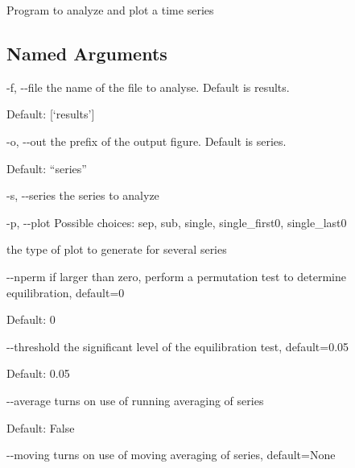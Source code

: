 \documentclass[letterpaper,10pt,english]{sphinxmanual}
\begin{document}
Program to analyze and plot a time series


%
\begin{sphinxVerbatim}[commandchars=\\\{\}]
  \PYG{p}{[}\PYG{p}{]} \PYG{p}{[}  \PYG{p}{[} \PYG{p}{]}\PYG{p}{]} \PYG{p}{[} \PYG{p}{]}
                      \PYG{p}{[}  \PYG{p}{[} \PYG{p}{]}\PYG{p}{]}
                      \PYG{p}{[} \PYG{p}{]}
                      \PYG{p}{[} \PYG{p}{]} \PYG{p}{[} \PYG{p}{]} \PYG{p}{[}\PYG{p}{]}
                      \PYG{p}{[} \PYG{p}{]}
\end{sphinxVerbatim}


\subsection{Named Arguments}
\label{\detokenize{tools:Named Arguments}}\begin{optionlist}{3cm}
\item [-f, -{-}file]  
the name of the file to analyse. Default is results.

Default: {[}‘results’{]}
\item [-o, -{-}out]  
the prefix of the output figure. Default is series.

Default: “series”
\item [-s, -{-}series]  
the series to analyze
\item [-p, -{-}plot]  
Possible choices: sep, sub, single, single\_first0, single\_last0

the type of plot to generate for several series
\item [-{-}nperm]  
if larger than zero, perform a permutation test to determine equilibration, default=0

Default: 0
\item [-{-}threshold]  
the significant level of the equilibration test, default=0.05

Default: 0.05
\item [-{-}average]  
turns on use of running averaging of series

Default: False
\item [-{-}moving]  
turns on use of moving averaging of series, default=None
\end{optionlist}
\end{document}
